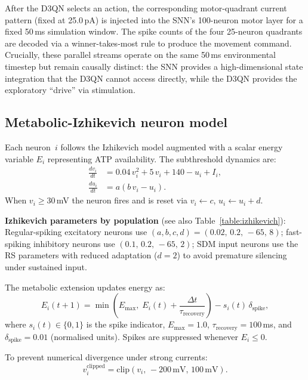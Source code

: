 \documentclass[journal,twocolumn]{IEEEtran}
\begin{document}
After the D3QN selects an action, the corresponding motor-quadrant
current pattern (fixed at 25.0\,pA) is injected into the SNN's 100-neuron motor
layer for a fixed 50\,ms simulation window.  The spike counts of the
four 25-neuron quadrants are decoded via a winner-takes-most rule to
produce the movement command.  Crucially, these parallel streams
operate on the same 50\,ms environmental timestep but remain
causally distinct: the SNN provides a high-dimensional state
integration that the D3QN cannot access directly, while the D3QN
provides the exploratory ``drive'' via stimulation.

\subsection{Metabolic-Izhikevich neuron model}

Each neuron~$i$ follows the Izhikevich model \cite{Izhikevich2003simple}
augmented with a scalar energy variable $E_i$ representing ATP
availability.  The subthreshold dynamics are:
\begin{align}
\frac{dv_i}{dt} &= 0.04\,v_i^{2} + 5\,v_i + 140 - u_i + I_i,
  \label{eq:izh_v}\\
\frac{du_i}{dt} &= a\!\left(b\,v_i - u_i\right).
\end{align}
When $v_i \geq 30$\,mV the neuron fires and is reset via
$v_i \leftarrow c$, $u_i \leftarrow u_i + d$.

\textbf{Izhikevich parameters by population} (see also
Table~\ref{table:izhikevich}): Regular-spiking excitatory neurons use
$(a,b,c,d) = (0.02,\,0.2,\,-65,\,8)$; fast-spiking inhibitory neurons
use $(0.1,\,0.2,\,-65,\,2)$; SDM input neurons use the RS parameters
with reduced adaptation ($d = 2$) to avoid premature silencing under
sustained input.

The metabolic extension updates energy as:
\begin{equation}
E_i(t{+}1) = \min\!\left(E_{\max},\;
  E_i(t) + \frac{\Delta t}{\tau_{\mathrm{recovery}}}\right)
  - s_i(t)\,\delta_{\mathrm{spike}},
\label{eq:energy}
\end{equation}
where $s_i(t) \in \{0,1\}$ is the spike indicator, $E_{\max} = 1.0$,
$\tau_{\mathrm{recovery}} = 100$\,ms, and
$\delta_{\mathrm{spike}} = 0.01$ (normalised units).  Spikes are
suppressed whenever $E_i \leq 0$.

To prevent numerical divergence under strong currents:
\begin{equation}
v_i^{\mathrm{clipped}} =
  \mathrm{clip}\!\left(v_i,\,-200\,\text{mV},\,100\,\text{mV}\right).
\label{eq:clip}
\end{equation}
\end{document}
